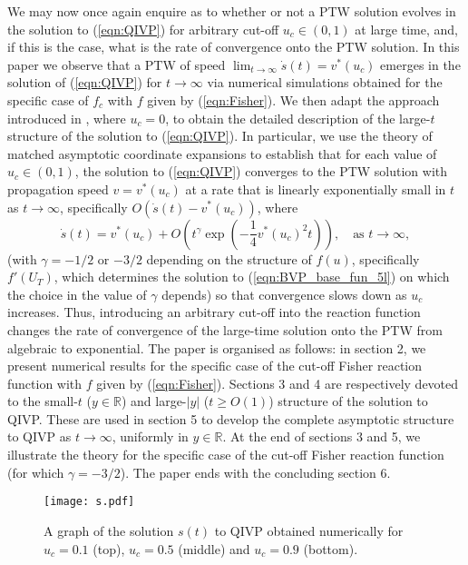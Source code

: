 \documentclass[11pt,a4paper]{article}
\newcommand{\eeref}[1]{(\ref{eqn:#1})}
\newcommand{\eelab}[1]{\label{eqn:#1}}
\newcommand{\fflab}[1]{\label{fig:#1}}
\def\beq{\begin{equation}}
\def\eeq{\end{equation}}
\begin{document}
We may now once again enquire as to whether or not  a PTW  solution
evolves in the solution to \eeref{QIVP} for arbitrary cut-off $u_c \in (0,1)$  at large time, and, if this is the case, what is the rate of convergence onto the PTW  solution. 
%
In this paper we  observe
that a PTW  of speed $\lim_{t\to\infty}\dot s (t)=v^*(u_c)$ emerges in 
the solution of \eeref{QIVP} for $t\to\infty$  via numerical simulations obtained for the specific case of $f_c$ with $f$ given by
\eeref{Fisher}.  
%
We then adapt the approach introduced in \cite{LeachNeedham2003}, where $u_c=0$, to obtain
%
the detailed description of the large-$t$ structure of the solution to \eeref{QIVP}. 
%
In particular, we use the theory of matched asymptotic coordinate expansions to 
establish that for  each value of $u_c\in(0,1)$, the solution to  \eeref{QIVP} 
 converges to
the PTW  solution  with propagation speed $v=v^*(u_c)$
at a rate that is linearly exponentially small  in $t$
as $t\to\infty$, specifically
 $O(\dot s(t)-v^*(u_c))$, 
where 
\beq\eelab{expo_convergence}
\dot s(t)=v^*(u_c)+O\left(t^\gamma\exp\left(-\frac{1}{4}v^*(u_c)^2t\right)\right),\quad\text{as $t\to\infty$},
\eeq
(with $\gamma=-1/2$ or $-3/2$ depending on the structure  of $f(u)$, 
specifically   $f'(U_T)$, 
which determines the solution to \eeref{BVP_base_fun_5l}  on which  %
the choice in the value of $\gamma$ depends) 
  so that convergence slows down as $u_c$ increases. 
%
Thus, introducing an arbitrary cut-off   into the reaction function 
changes  the rate of convergence of the large-time solution onto the PTW from algebraic to exponential.  The paper is organised as follows: in section 2, we present numerical results for the specific case of the cut-off Fisher reaction function with $f$ given by
\eeref{Fisher}. Sections 3 and 4 
are respectively devoted to  the small-$t$ ($y\in\mathbb{R}$) and
  large-$|y|$ ($t\geq O(1)$)  structure of the
solution to QIVP. 
These are used in section 5 to develop the complete  asymptotic structure to QIVP as $t\to\infty$,
uniformly in $y\in\mathbb{R}$.
%
At the end of sections 3 and  5, we illustrate the theory  
for the specific case of the cut-off Fisher reaction function (for which $\gamma=-3/2$).
The paper ends with the concluding section 6. 
 


 \begin{figure} 
\centering
{\texttt{[image: s.pdf]}} 
 \caption{A graph of the solution $s(t)$ to QIVP obtained numerically for $u_c=0.1$ (top), $u_c=0.5$ (middle) and $u_c=0.9$ (bottom). }
 \fflab{PTWs}  
 \end{figure}
\end{document}
